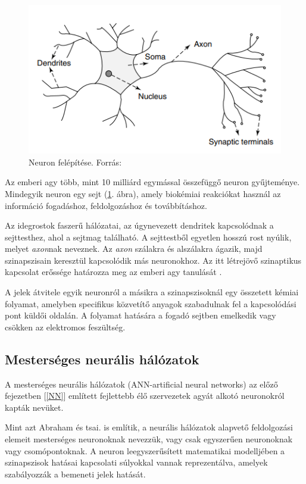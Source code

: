 \documentclass[12pt,a4]{article}
\begin{document}
    \begin{figure}[h]	
		\centering
		\includegraphics[width=0.8\linewidth]{neuron1}
		\caption{Neuron felépítése. 
			Forrás: \cite{ann}}
        \label{fig:neuron1}
	\end{figure}
 
	Az emberi agy több, mint 10 milliárd egymással összefüggő neuron gyűjteménye. Mindegyik neuron egy sejt (\ref{fig:neuron1}. ábra), amely biokémiai reakciókat használ az információ fogadáshoz, feldolgozáshoz és továbbításhoz.
	
	Az idegrostok faszerű hálózatai, az úgynevezett dendritek kapcsolódnak a sejttesthez, ahol a sejtmag található. A sejttestből egyetlen hosszú rost nyúlik, melyet \textit{axon}nak neveznek. Az \textit{axon} szálakra és alszálakra ágazik, majd szinapszisain keresztül kapcsolódik más neuronokhoz. Az itt létrejövő szinaptikus kapcsolat erőssége határozza meg az emberi agy tanulását .
	
	A jelek átvitele egyik neuronról a másikra a szinapszisoknál egy összetett kémiai folyamat, amelyben specifikus közvetítő anyagok szabadulnak fel a kapcsolódási pont küldői oldalán. A folyamat hatására a fogadó sejtben emelkedik vagy csökken az elektromos feszültség.
	
	\subsection{Mesterséges neurális hálózatok}
	A mesterséges neurális hálózatok (ANN-artificial neural networks) az előző fejezetben [\autoref{NN}] említett fejlettebb élő szervezetek agyát alkotó neuronokról kapták nevüket. 
	
	Mint azt Abraham és tsai. \cite{ann} is említik, a neurális hálózatok alapvető feldolgozási elemeit mesterséges neuronoknak nevezzük, vagy csak egyszerűen neuronoknak vagy csomópontoknak. A neuron leegyszerűsített matematikai modelljében a szinapszisok hatásai kapcsolati súlyokkal vannak reprezentálva, amelyek szabályozzák a bemeneti jelek hatását.
	
\end{document}
